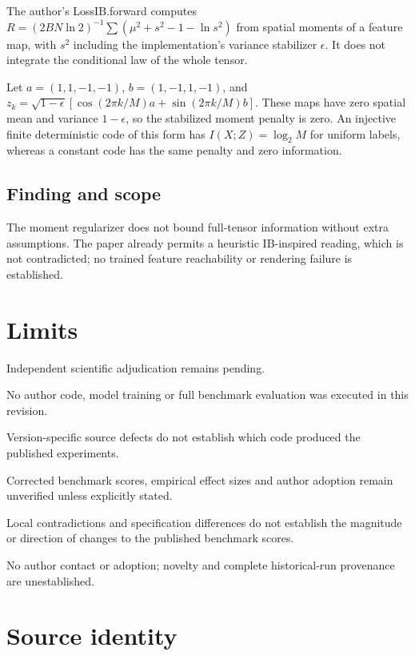 \documentclass[11pt]{article}
\begin{document}
The author's LossIB.forward computes \(R=(2BN\ln2)^{-1}\sum(\mu^2+s^2-1-\ln s^2)\) from spatial moments of a feature map, with \(s^2\) including the implementation's variance stabilizer \(\epsilon\). It does not integrate the conditional law of the whole tensor.

Let \(a=(1,1,-1,-1)\), \(b=(1,-1,1,-1)\), and \(z_k=\sqrt{1-\epsilon}[\cos(2\pi k/M)a+\sin(2\pi k/M)b]\). These maps have zero spatial mean and variance \(1-\epsilon\), so the stabilized moment penalty is zero. An injective finite deterministic code of this form has \(I(X;Z)=\log_2M\) for uniform labels, whereas a constant code has the same penalty and zero information.

\subsection*{Finding and scope}

The moment regularizer does not bound full-tensor information without extra assumptions. The paper already permits a heuristic IB-inspired reading, which is not contradicted; no trained feature reachability or rendering failure is established.

\section*{Limits}

Independent scientific adjudication remains pending.\par

No author code, model training or full benchmark evaluation was executed in this revision.\par

Version-specific source defects do not establish which code produced the published experiments.\par

Corrected benchmark scores, empirical effect sizes and author adoption remain unverified unless explicitly stated.\par

Local contradictions and specification differences do not establish the magnitude or direction of changes to the published benchmark scores.\par

No author contact or adoption; novelty and complete historical-run provenance are unestablished.\par

\section*{Source identity}
\end{document}

